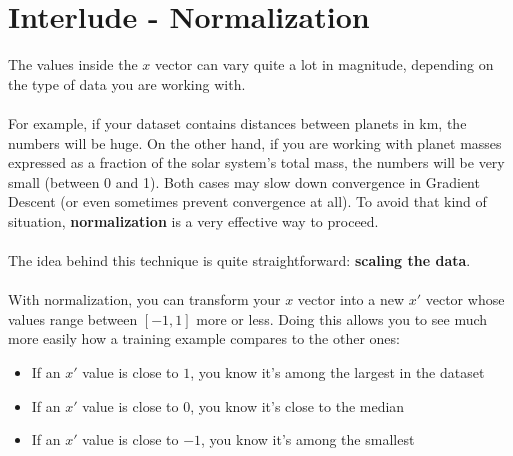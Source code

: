 
\section*{Interlude - Normalization}

The values inside the $x$ vector can vary quite a lot in magnitude,
depending on the type of data you are working with.\\
\\
For example, if your dataset contains distances between planets in km, the numbers will be huge.
On the other hand, if you are working with planet masses expressed as a fraction of the solar system's total mass, the numbers will be very small (between 0 and 1).
Both cases may slow down convergence in Gradient Descent (or even sometimes prevent convergence at all).
To avoid that kind of situation, \textbf{normalization} is a very effective way to proceed.\\
\\
The idea behind this technique is quite straightforward: \textbf{scaling the data}.\\
\\
With normalization, you can transform your $x$ vector into a new $x'$ vector whose values range between $[-1, 1]$ more or less. Doing this allows you to see much more easily how a training example compares to the other ones:
\begin{itemize}
    \item If an $x'$ value is close to $1$, you know it's among the largest in the dataset
    \item If an $x'$ value is close to $0$, you know it's close to the median
    \item If an $x'$ value is close to $-1$, you know it's among the smallest
\end{itemize}
